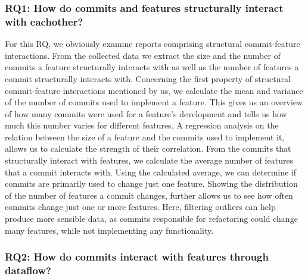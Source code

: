 \subsubsection*{\textbf{RQ1: How do commits and features structurally interact with eachother?}}

For this RQ, we obviously examine reports comprising structural commit-feature interactions.
From the collected data we extract the size and the number of commits a feature structurally interacts with as well as the number of features a commit structurally interacts with.
Concerning the first property of structural commit-feature interactions mentioned by us, we calculate the mean and variance of the number of commits used to implement a feature.
This gives us an overview of how many commits were used for a feature's development and tells us how much this number varies for different features.
A regression analysis on the relation between the size of a feature and the commits used to implement it, allows us to calculate the strength of their correlation. 
From the commits that structurally interact with features, we calculate the average number of features that a commit interacts with.
Using the calculated average, we can determine if commits are primarily used to change just one feature.
Showing the distribution of the number of features a commit changes, further allows us to see how often commits change just one or more features.
Here, filtering outliers can help produce more sensible data, as commits responsible for refactoring could change many features, while not implementing any functionality. 

\subsubsection*{\textbf{RQ2: How do commits interact with features through dataflow?}}

